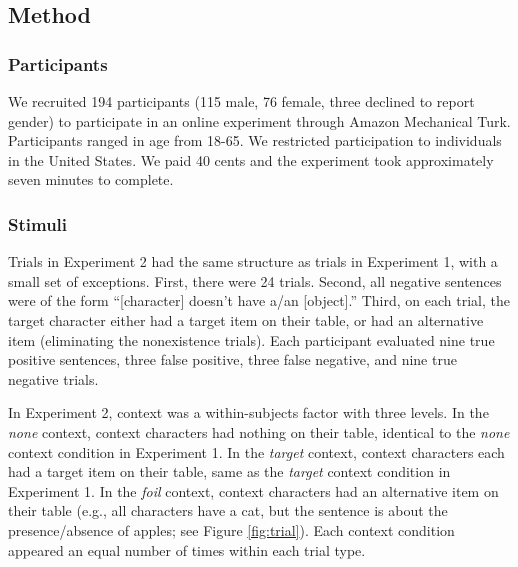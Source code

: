 \documentclass[10pt,letterpaper]{article}
\begin{document}

\subsection{Method}

\subsubsection{Participants}

We recruited 194 participants (115 male, 76 female, three declined to report gender) to participate in an online experiment through Amazon Mechanical Turk.  Participants ranged in age from 18-65.  We restricted participation to individuals in the United States. We paid 40 cents and the experiment took approximately seven minutes to complete.  

\subsubsection{Stimuli}

Trials in Experiment 2 had the same structure as trials in Experiment 1, with a small set of exceptions. First, there were 24 trials. Second, all negative sentences were of the form ``[character] doesn't have a/an [object].'' Third, on each trial, the target character either had a target item on their table, or had an alternative item (eliminating the nonexistence trials).  Each participant evaluated nine true positive sentences, three false positive, three false negative, and nine true negative trials.

In Experiment 2, context was a within-subjects factor with three levels. In the \emph{none} context, context characters had nothing on their table, identical to the \emph{none} context condition in Experiment 1. In the \emph{target} context, context characters each had a target item on their table, same as the \emph{target} context condition in Experiment 1. In the \emph{foil} context, context characters had an alternative item on their table (e.g., all characters have a cat, but the sentence is about the presence/absence of apples; see Figure \ref{fig:trial}).  Each context condition appeared an equal number of times within each trial type.  
\end{document}
